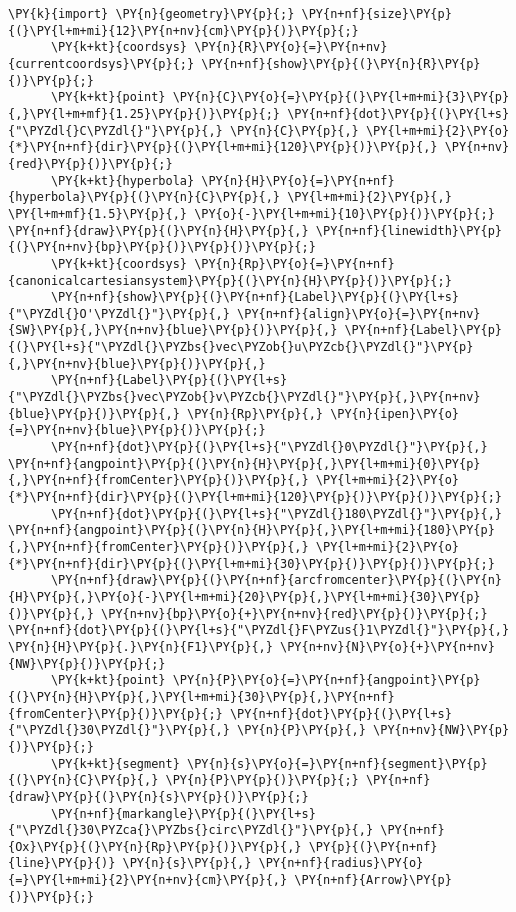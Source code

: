 \begin{Verbatim}[commandchars=\\\{\}]
      \PY{k}{import} \PY{n}{geometry}\PY{p}{;} \PY{n+nf}{size}\PY{p}{(}\PY{l+m+mi}{12}\PY{n+nv}{cm}\PY{p}{)}\PY{p}{;}
      \PY{k+kt}{coordsys} \PY{n}{R}\PY{o}{=}\PY{n+nv}{currentcoordsys}\PY{p}{;} \PY{n+nf}{show}\PY{p}{(}\PY{n}{R}\PY{p}{)}\PY{p}{;}
      \PY{k+kt}{point} \PY{n}{C}\PY{o}{=}\PY{p}{(}\PY{l+m+mi}{3}\PY{p}{,}\PY{l+m+mf}{1.25}\PY{p}{)}\PY{p}{;} \PY{n+nf}{dot}\PY{p}{(}\PY{l+s}{"\PYZdl{}C\PYZdl{}"}\PY{p}{,} \PY{n}{C}\PY{p}{,} \PY{l+m+mi}{2}\PY{o}{*}\PY{n+nf}{dir}\PY{p}{(}\PY{l+m+mi}{120}\PY{p}{)}\PY{p}{,} \PY{n+nv}{red}\PY{p}{)}\PY{p}{;}
      \PY{k+kt}{hyperbola} \PY{n}{H}\PY{o}{=}\PY{n+nf}{hyperbola}\PY{p}{(}\PY{n}{C}\PY{p}{,} \PY{l+m+mi}{2}\PY{p}{,} \PY{l+m+mf}{1.5}\PY{p}{,} \PY{o}{-}\PY{l+m+mi}{10}\PY{p}{)}\PY{p}{;} \PY{n+nf}{draw}\PY{p}{(}\PY{n}{H}\PY{p}{,} \PY{n+nf}{linewidth}\PY{p}{(}\PY{n+nv}{bp}\PY{p}{)}\PY{p}{)}\PY{p}{;}
      \PY{k+kt}{coordsys} \PY{n}{Rp}\PY{o}{=}\PY{n+nf}{canonicalcartesiansystem}\PY{p}{(}\PY{n}{H}\PY{p}{)}\PY{p}{;}
      \PY{n+nf}{show}\PY{p}{(}\PY{n+nf}{Label}\PY{p}{(}\PY{l+s}{"\PYZdl{}O'\PYZdl{}"}\PY{p}{,} \PY{n+nf}{align}\PY{o}{=}\PY{n+nv}{SW}\PY{p}{,}\PY{n+nv}{blue}\PY{p}{)}\PY{p}{,} \PY{n+nf}{Label}\PY{p}{(}\PY{l+s}{"\PYZdl{}\PYZbs{}vec\PYZob{}u\PYZcb{}\PYZdl{}"}\PY{p}{,}\PY{n+nv}{blue}\PY{p}{)}\PY{p}{,}
      \PY{n+nf}{Label}\PY{p}{(}\PY{l+s}{"\PYZdl{}\PYZbs{}vec\PYZob{}v\PYZcb{}\PYZdl{}"}\PY{p}{,}\PY{n+nv}{blue}\PY{p}{)}\PY{p}{,} \PY{n}{Rp}\PY{p}{,} \PY{n}{ipen}\PY{o}{=}\PY{n+nv}{blue}\PY{p}{)}\PY{p}{;}
      \PY{n+nf}{dot}\PY{p}{(}\PY{l+s}{"\PYZdl{}0\PYZdl{}"}\PY{p}{,} \PY{n+nf}{angpoint}\PY{p}{(}\PY{n}{H}\PY{p}{,}\PY{l+m+mi}{0}\PY{p}{,}\PY{n+nf}{fromCenter}\PY{p}{)}\PY{p}{,} \PY{l+m+mi}{2}\PY{o}{*}\PY{n+nf}{dir}\PY{p}{(}\PY{l+m+mi}{120}\PY{p}{)}\PY{p}{)}\PY{p}{;}
      \PY{n+nf}{dot}\PY{p}{(}\PY{l+s}{"\PYZdl{}180\PYZdl{}"}\PY{p}{,} \PY{n+nf}{angpoint}\PY{p}{(}\PY{n}{H}\PY{p}{,}\PY{l+m+mi}{180}\PY{p}{,}\PY{n+nf}{fromCenter}\PY{p}{)}\PY{p}{,} \PY{l+m+mi}{2}\PY{o}{*}\PY{n+nf}{dir}\PY{p}{(}\PY{l+m+mi}{30}\PY{p}{)}\PY{p}{)}\PY{p}{;}
      \PY{n+nf}{draw}\PY{p}{(}\PY{n+nf}{arcfromcenter}\PY{p}{(}\PY{n}{H}\PY{p}{,}\PY{o}{-}\PY{l+m+mi}{20}\PY{p}{,}\PY{l+m+mi}{30}\PY{p}{)}\PY{p}{,} \PY{n+nv}{bp}\PY{o}{+}\PY{n+nv}{red}\PY{p}{)}\PY{p}{;} \PY{n+nf}{dot}\PY{p}{(}\PY{l+s}{"\PYZdl{}F\PYZus{}1\PYZdl{}"}\PY{p}{,} \PY{n}{H}\PY{p}{.}\PY{n}{F1}\PY{p}{,} \PY{n+nv}{N}\PY{o}{+}\PY{n+nv}{NW}\PY{p}{)}\PY{p}{;}
      \PY{k+kt}{point} \PY{n}{P}\PY{o}{=}\PY{n+nf}{angpoint}\PY{p}{(}\PY{n}{H}\PY{p}{,}\PY{l+m+mi}{30}\PY{p}{,}\PY{n+nf}{fromCenter}\PY{p}{)}\PY{p}{;} \PY{n+nf}{dot}\PY{p}{(}\PY{l+s}{"\PYZdl{}30\PYZdl{}"}\PY{p}{,} \PY{n}{P}\PY{p}{,} \PY{n+nv}{NW}\PY{p}{)}\PY{p}{;}
      \PY{k+kt}{segment} \PY{n}{s}\PY{o}{=}\PY{n+nf}{segment}\PY{p}{(}\PY{n}{C}\PY{p}{,} \PY{n}{P}\PY{p}{)}\PY{p}{;} \PY{n+nf}{draw}\PY{p}{(}\PY{n}{s}\PY{p}{)}\PY{p}{;}
      \PY{n+nf}{markangle}\PY{p}{(}\PY{l+s}{"\PYZdl{}30\PYZca{}\PYZbs{}circ\PYZdl{}"}\PY{p}{,} \PY{n+nf}{Ox}\PY{p}{(}\PY{n}{Rp}\PY{p}{)}\PY{p}{,} \PY{p}{(}\PY{n+nf}{line}\PY{p}{)} \PY{n}{s}\PY{p}{,} \PY{n+nf}{radius}\PY{o}{=}\PY{l+m+mi}{2}\PY{n+nv}{cm}\PY{p}{,} \PY{n+nf}{Arrow}\PY{p}{)}\PY{p}{;}
\end{Verbatim}
